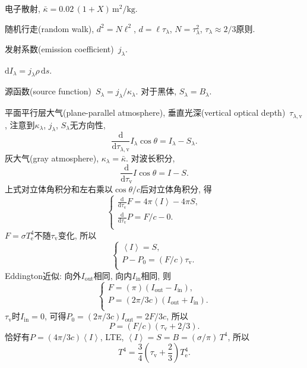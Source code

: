电子散射, $\bar{\kappa}=0.02\,(1+X)\,\text{m}^2/\text{kg}$.

随机行走(random walk), $d^2=N\ell^2$, $d=\ell\tau_\lambda$, $N=\tau_\lambda^2$, $\tau_\lambda\approx 2/3$原则.

发射系数(emission coefficient)~$j_\lambda$.

$\mathrm{d}I_\lambda
=j_\lambda\rho\,\mathrm{d}s$.

源函数(source function)~$S_\lambda=j_\lambda/\kappa_\lambda$. 对于黑体, $S_\lambda=B_\lambda$.

平面平行层大气(plane-parallel atmosphere), 垂直光深(vertical optical depth)~$\tau_{\lambda,\text{v}}$, 注意到$\kappa_\lambda$, $j_\lambda$, $S_\lambda$无方向性,
\begin{equation*}
    \frac{\mathrm{d}}{\mathrm{d}\tau_{\lambda,\text{v}}}I_\lambda\cos\theta=I_\lambda-S_\lambda.
\end{equation*}
灰大气(gray atmosphere), $\kappa_\lambda=\bar{\kappa}$. 对波长积分,
\begin{equation*}
    \frac{\mathrm{d}}{\mathrm{d}\tau_{\text{v}}}I\cos\theta=I-S.
\end{equation*}
上式对立体角积分和左右乘以$\cos\theta/c$后对立体角积分, 得
\begin{equation*}
    \begin{cases}
        \frac{\mathrm{d}}{\mathrm{d}\tau_{\text{v}}}F=4\pi \left\langle I\right\rangle -4\pi S , \\
        \frac{\mathrm{d}}{\mathrm{d}\tau_{\text{v}}}P=F/c-0 . \\
    \end{cases}
\end{equation*}
$F=\sigma T_\text{e}^4$不随$\tau_{\text{v}}$变化, 所以
\begin{equation*}
    \begin{cases}
        \left\langle I\right\rangle = S , \\
        P-P_0=(F/c)\tau_{\text{v}} . \\
    \end{cases}
\end{equation*}
Eddington近似: 向外$I_\text{out}$相同, 向内$I_\text{in}$相同, 则
\begin{equation*}
    \begin{cases}
        F=(\pi)(I_\text{out}-I_\text{in}) , \\
        P=(2\pi/3c)(I_\text{out}+I_\text{in}) . \\
    \end{cases}
\end{equation*}
$\tau_{\text{v}}$时$I_\text{in}=0$, 可得$P_0=(2\pi/3c)I_\text{out}=2F/3c$, 所以
\begin{equation*}
    P=(F/c)(\tau_{\text{v}}+2/3).
\end{equation*}
恰好有$P=(4\pi/3c)\left\langle I\right\rangle $, LTE, $\left\langle I\right\rangle=S=B=(\sigma/\pi)\,T^4$, 所以
\begin{equation*}
    T^4 = \frac{3}{4}(\tau_{\text{v}}+\frac{2}{3})T_\text{e}^4.
\end{equation*}

